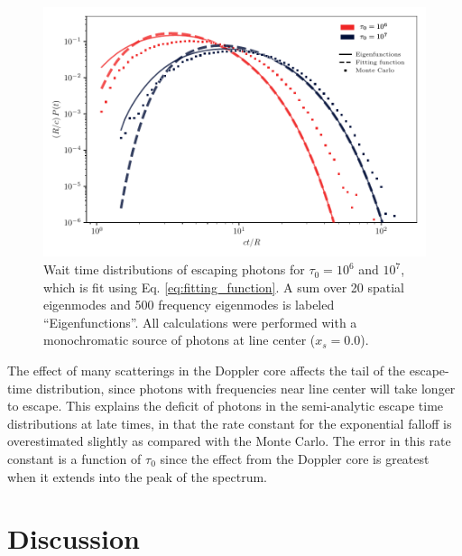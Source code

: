 \documentclass{aastex63}
\begin{document}
\begin{figure}
    \centering
    \includegraphics{waittime.pdf}
    \caption{Wait time distributions of escaping photons for $\tau_0=10^6$ and $10^7$, which is fit using Eq. \ref{eq:fitting_function}. A sum over 20 spatial eigenmodes and 500 frequency eigenmodes is labeled ``Eigenfunctions''. All calculations were performed with a monochromatic source of photons at line center ($x_s = 0.0$).}
    \label{fig:escape_time}
\end{figure}

The effect of many scatterings in the Doppler core affects the tail of the escape-time distribution, since photons with frequencies near line center will take longer to escape. This explains the deficit of photons in the semi-analytic escape time distributions at late times, in that the rate constant for the exponential falloff is overestimated slightly as compared with the Monte Carlo. The error in this rate constant is a function of $\tau_0$ since the effect from the Doppler core is greatest when it extends into the peak of the spectrum.

\section{Discussion}
\end{document}
